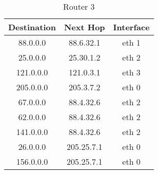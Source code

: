 \documentclass{WeSTassignment}
\begin{document}
\begin{table}[h]
\centering
\caption{Router 3}
\label{Router 3}
\begin{tabular}{ccc}
\hline
\multicolumn{1}{|c|}{\textbf{Destination}} & \multicolumn{1}{c|}{\textbf{Next Hop}} & \multicolumn{1}{c|}{\textbf{Interface}} \\ \hline
88.0.0.0                                   & 88.6.32.1                              & eth 1                                   \\
25.0.0.0                                   & 25.30.1.2                              & eth 2                                   \\
121.0.0.0                                  & 121.0.3.1                              & eth 3                                   \\
205.0.0.0                                  & 205.3.7.2                              & eth 0                                   \\
67.0.0.0                                   & 88.4.32.6                              & eth 2                                   \\
62.0.0.0                                   & 88.4.32.6                              & eth 2                                   \\
141.0.0.0                                  & 88.4.32.6                              & eth 2                                   \\
26.0.0.0                                   & 205.25.7.1                             & eth 0                                   \\
156.0.0.0                                  & 205.25.7.1                             & eth 0                                  
\end{tabular}
\end{table}


\end{document}
